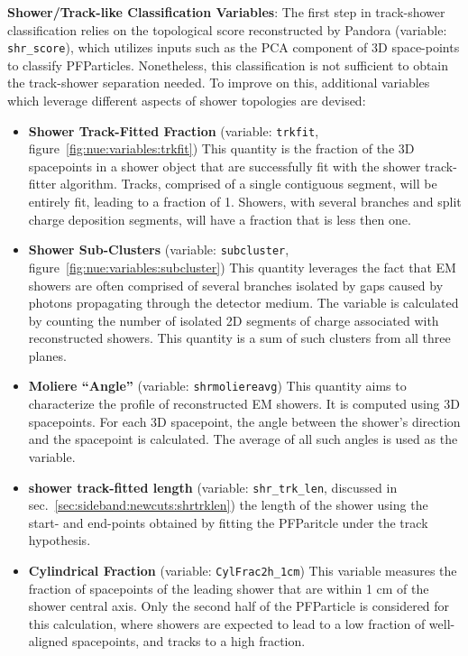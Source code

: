 \par \noindent \textbf{Shower/Track-like  Classification Variables}: The first step in track-shower classification relies on the topological score reconstructed by Pandora (variable: \texttt{shr\_score}), which utilizes inputs such as the PCA component of 3D space-points to classify PFParticles. Nonetheless, this classification is not sufficient to obtain the track-shower separation needed. To improve on this, additional variables which leverage different aspects of shower topologies are devised:

\begin{itemize}

    \item[] \textbf{Shower Track-Fitted Fraction} (variable: \texttt{trkfit}, figure~\ref{fig:nue:variables:trkfit}) This quantity is the fraction of the 3D spacepoints in a shower object that are successfully fit with the shower track-fitter algorithm. Tracks, comprised of a single contiguous segment, will be entirely fit, leading to a fraction of 1. Showers, with several branches and split charge deposition segments, will have a fraction that is less then one.
    \item[] \textbf{Shower Sub-Clusters} (variable: \texttt{subcluster}, figure~\ref{fig:nue:variables:subcluster}) This quantity leverages the fact that EM showers are often comprised of several branches isolated by gaps caused by photons propagating through the detector medium. The variable is calculated by counting the number of isolated 2D segments of charge associated with reconstructed showers. This quantity is a sum of such clusters from all three planes.
    \item[] \textbf{Moliere ``Angle''} (variable: \texttt{shrmoliereavg}) This quantity aims to characterize the profile of reconstructed EM showers. It is computed using 3D spacepoints. For each 3D spacepoint, the angle between the shower's direction and the spacepoint is calculated. The average of all such angles is used as the variable.
    \item[] \textbf{shower track-fitted length} (variable: \texttt{shr\_trk\_len}, discussed in sec.~\ref{sec:sideband:newcuts:shrtrklen}) the length of the shower using the start- and end-points obtained by fitting the PFParitcle under the track hypothesis.
    \item[] \textbf{Cylindrical Fraction} (variable: \texttt{CylFrac2h\_1cm}) This variable measures the fraction of spacepoints of the leading shower that are within 1 cm of the shower central axis. Only the second half of the PFParticle is considered for this calculation, where showers are expected to lead to a low fraction of well-aligned spacepoints, and tracks to a high fraction.

\end{itemize}

